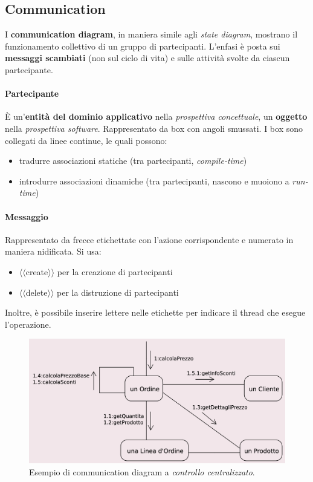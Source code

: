 \subsection{Communication}

I \textbf{communication diagram}, in maniera simile agli \textit{state diagram}, mostrano il funzionamento collettivo di un gruppo di partecipanti. L'enfasi è posta sui \textbf{messaggi scambiati} (non sul ciclo di vita) e sulle attività svolte da ciascun partecipante.

\paragraph{Partecipante} È un'\textbf{entità del dominio applicativo} nella \textit{prospettiva concettuale}, un \textbf{oggetto} nella \textit{prospettiva software}. Rappresentato da box con angoli smussati. I box sono collegati da linee continue, le quali possono:
\begin{itemize}
    \item tradurre associazioni statiche (tra partecipanti, \textit{compile-time})
    \item introdurre associazioni dinamiche (tra partecipanti, nascono e muoiono a \textit{run-time})
\end{itemize}

\paragraph{Messaggio} Rappresentato da frecce etichettate con l'azione corrispondente e numerato in maniera nidificata. Si usa:
\begin{itemize}
    \item $\langle\langle$create$\rangle\rangle$ per la creazione di partecipanti
    \item $\langle\langle$delete$\rangle\rangle$ per la distruzione di partecipanti
\end{itemize}
Inoltre, è possibile inserire lettere nelle etichette per indicare il thread che esegue l'operazione.

\begin{figure}[h!]
    \centering
    \includegraphics[width=0.75\linewidth]{assets/UML/communication/communication-1.png}
    \caption{Esempio di communication diagram a \textit{controllo centralizzato}.}
\end{figure}

\newpage